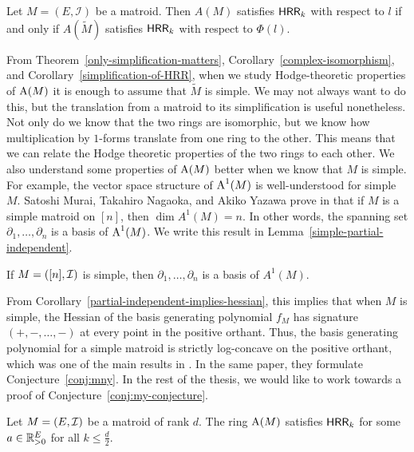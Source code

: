 \documentclass{puthesis-UG}
\begin{document}
\begin{cor} \label{simplification-of-HRR}
	Let $M = (E, \mathcal{I})$ be a matroid. Then $A(M)$ satisfies $\mathsf{HRR}_k$ with respect to $l$ if and only if $A(\widetilde{M})$ satisfies $\mathsf{HRR}_k$ with respect to $\Phi(l)$. 
\end{cor}

From Theorem~\ref{only-simplification-matters}, Corollary~\ref{complex-isomorphism}, and Corollary~\ref{simplification-of-HRR}, when we study Hodge-theoretic properties of $\operatorname{A}(M)$ it is enough to assume that $\widetilde{M}$ is simple. We may not always want to do this, but the translation from a matroid to its simplification is useful nonetheless. Not only do we know that the two rings are isomorphic, but we know how multiplication by $1$-forms translate from one ring to the other. This means that we can relate the Hodge theoretic properties of the two rings to each other. We also understand some properties of $\operatorname{A}(M)$ better when we know that $M$ is simple. For example, the vector space structure of $\operatorname{A}^1(M)$ is well-understood for simple $M$. Satoshi Murai, Takahiro Nagaoka, and Akiko Yazawa prove in \cite{MNY} that if $M$ is a simple matroid on $[n]$, then $\dim A^1(M) = n$. In other words, the spanning set $\partial_1, \ldots, \partial_n$ is a basis of $\operatorname{A}^1(M)$. We write this result in Lemma~\ref{simple-partial-independent}. 

\begin{lem}  \label{simple-partial-independent}
	If $M = ([n], \mathcal{I})$ is simple, then $\partial_1, \ldots, \partial_n$ is a basis of $A^1(M)$.
\end{lem}

From Corollary~\ref{partial-independent-implies-hessian}, this implies that when $M$ is simple, the Hessian of the basis generating polynomial $f_M$ has signature $(+,-, \ldots, -)$ at every point in the positive orthant. Thus, the basis generating polynomial for a simple matroid is strictly log-concave on the positive orthant, which was one of the main results in \cite{MNY}. In the same paper, they formulate Conjecture~\ref{conj:mny}. In the rest of the thesis, we would like to work towards a proof of Conjecture~\ref{conj:my-conjecture}. 

\begin{conj} \label{conj:mny}
	Let $M = (E, \mathcal{I})$ be a matroid of rank $d$. The ring $\operatorname{A}(M)$ satisfies $\mathsf{HRR}_k$ for some $a \in \mathbb{R}^E_{> 0}$ for all $k \leq \frac{d}{2}$.  
\end{conj}
\end{document}
